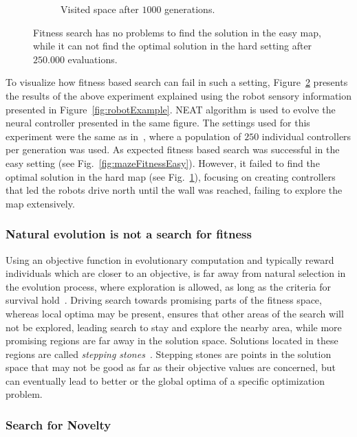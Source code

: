 \begin{figure}[t!]
\begin{subfigure}[b]{0.3\textwidth}
\caption{Visited space after $1000$ generations.}
\label{fig:mazeFitnessHard}
\end{subfigure}
\caption{Fitness search has no problems to find the solution in the easy map, while it can not find the optimal solution in the hard setting after $250.000$ evaluations.}
\label{fig:mazeFitness}
\end{figure}


To visualize how fitness based search can fail in such a setting, Figure~\ref{fig:mazeFitness} presents the results of the above experiment explained using the robot sensory information presented in Figure~\ref{fig:robotExample}. NEAT algorithm is used to evolve the neural controller presented in the same figure. The settings used for this experiment were the same as in~\citep{lehman2011abandoning}, where a population of $250$ individual controllers per generation was used. As expected fitness based search was successful in the easy setting (see Fig.~\ref{fig:mazeFitnessEasy}). However, it failed to find the optimal solution in the hard map (see Fig.~\ref{fig:mazeFitnessHard}), focusing on creating controllers that led the robots drive north until the wall was reached, failing to explore the map extensively.

\subsubsection*{Natural evolution is not a search for fitness}

Using an objective function in evolutionary computation and typically reward individuals which are closer to an objective, is far away from natural selection in the evolution process, where exploration is allowed, as long as the criteria for survival hold~\citep{lehman2010revising}. Driving search towards promising parts of the fitness space, whereas local optima may be present, ensures that other areas of the search will not be explored, leading search to stay and explore the nearby area, while more promising regions are far away in the solution space. Solutions located in these regions are called \emph{stepping stones}~\citep{lehman2008exploiting,lehman2011abandoning,lehman2010revising,risi2009novelty}. Stepping stones are points in the solution space that may not be good as far as their objective values are concerned, but can eventually lead to better or the global optima of a specific optimization problem.


\subsubsection*{Search for Novelty}

